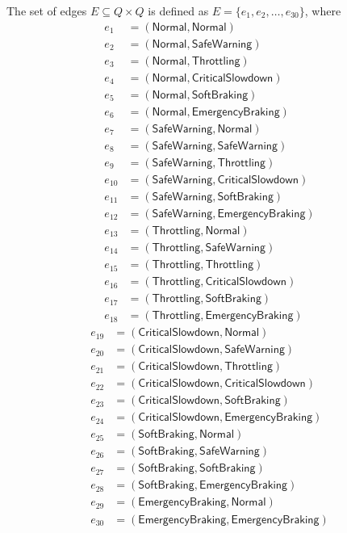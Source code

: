 \documentclass[12pt]{article}
\theoremstyle{definition}
\begin{document}
The set of edges $E \subseteq Q \times Q$ is defined as $E = \{ e_1, e_2, \dots, e_{30} \}$, where
\[
\begin{aligned}
e_1 &= (\mathsf{Normal}, \mathsf{Normal}) \\
e_2 &= (\mathsf{Normal}, \mathsf{SafeWarning}) \\
e_3 &= (\mathsf{Normal}, \mathsf{Throttling}) \\
e_4 &= (\mathsf{Normal}, \mathsf{CriticalSlowdown}) \\
e_5 &= (\mathsf{Normal}, \mathsf{SoftBraking}) \\
e_6 &= (\mathsf{Normal}, \mathsf{EmergencyBraking}) \\
e_7 &= (\mathsf{SafeWarning}, \mathsf{Normal}) \\
e_8 &= (\mathsf{SafeWarning}, \mathsf{SafeWarning}) \\
e_9 &= (\mathsf{SafeWarning}, \mathsf{Throttling}) \\
e_{10} &= (\mathsf{SafeWarning}, \mathsf{CriticalSlowdown}) \\
e_{11} &= (\mathsf{SafeWarning}, \mathsf{SoftBraking}) \\
e_{12} &= (\mathsf{SafeWarning}, \mathsf{EmergencyBraking}) \\
e_{13} &= (\mathsf{Throttling}, \mathsf{Normal}) \\
e_{14} &= (\mathsf{Throttling}, \mathsf{SafeWarning}) \\
e_{15} &= (\mathsf{Throttling}, \mathsf{Throttling}) \\
e_{16} &= (\mathsf{Throttling}, \mathsf{CriticalSlowdown}) \\
e_{17} &= (\mathsf{Throttling}, \mathsf{SoftBraking}) \\
e_{18} &= (\mathsf{Throttling}, \mathsf{EmergencyBraking}) 
\end{aligned}
\]
\[
\begin{aligned}
e_{19} &= (\mathsf{CriticalSlowdown}, \mathsf{Normal}) \\
e_{20} &= (\mathsf{CriticalSlowdown}, \mathsf{SafeWarning}) \\
e_{21} &= (\mathsf{CriticalSlowdown}, \mathsf{Throttling}) \\
e_{22} &= (\mathsf{CriticalSlowdown}, \mathsf{CriticalSlowdown}) \\
e_{23} &= (\mathsf{CriticalSlowdown}, \mathsf{SoftBraking}) \\
e_{24} &= (\mathsf{CriticalSlowdown}, \mathsf{EmergencyBraking}) \\
e_{25} &= (\mathsf{SoftBraking}, \mathsf{Normal}) \\
e_{26} &= (\mathsf{SoftBraking}, \mathsf{SafeWarning}) \\
e_{27} &= (\mathsf{SoftBraking}, \mathsf{SoftBraking}) \\
e_{28} &= (\mathsf{SoftBraking}, \mathsf{EmergencyBraking}) \\
e_{29} &= (\mathsf{EmergencyBraking}, \mathsf{Normal}) \\
e_{30} &= (\mathsf{EmergencyBraking}, \mathsf{EmergencyBraking})
\end{aligned}
\]
\end{document}
